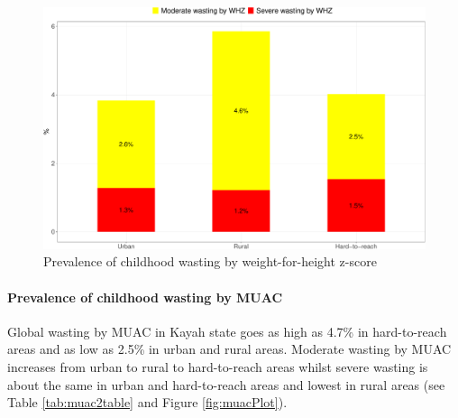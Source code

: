 \documentclass[12pt,a4paper]{article}
\let\oldparagraph\paragraph
\renewcommand{\paragraph}[1]{\oldparagraph{#1}\mbox{}}
\begin{document}
\begin{figure}[H]

{\centering \includegraphics{kayahReport_files/figure-latex/whzPlot-1} 

}

\caption{Prevalence of childhood wasting by weight-for-height z-score}\label{fig:whzPlot}
\end{figure}

\hypertarget{muac}{%
\paragraph{Prevalence of childhood wasting by MUAC}\label{muac}}

Global wasting by MUAC in Kayah state goes as high as 4.7\% in hard-to-reach areas and as low as 2.5\% in urban and rural areas. Moderate wasting by MUAC increases from urban to rural to hard-to-reach areas whilst severe wasting is about the same in urban and hard-to-reach areas and lowest in rural areas (see Table \ref{tab:muac2table} and Figure \ref{fig:muacPlot}).
\end{document}
